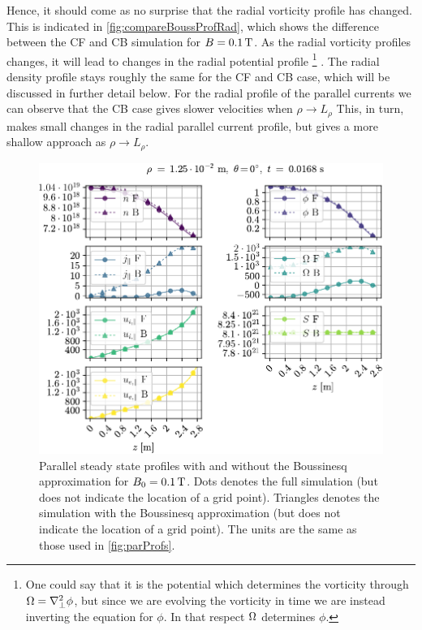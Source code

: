 Hence, it should come as no surprise that the radial vorticity profile has changed.
This is indicated in \cref{fig:compareBoussProfRad}, which shows the difference between the CF and CB simulation for $B=0.1\, \text{T}$.
As the radial vorticity profiles changes, it will lead to changes in the radial potential profile%
%
\footnote{One could say that it is the potential which determines the vorticity through $\Omega = \nabla_\perp^2 \phi$, but since we are evolving the vorticity in time we are instead inverting the equation for $\phi$.
In that respect $\Omega$ determines $\phi$.}%
%
.
The radial density profile stays roughly the same for the CF and CB case, which will be discussed in further detail below.
For the radial profile of the parallel currents we can observe that the CB case gives slower velocities when $\rho \to L_\rho$
This, in turn, makes small changes in the radial parallel current profile, but gives a more shallow approach as $\rho\to L_\rho$.
%
\begin{figure}[h]
    \centering
    \includegraphics{fig/results/compareBouss/1DProfPar001B}
    \caption{Parallel steady state profiles with and without the Boussinesq approximation for $B_0=0.1\, \text{T}$.
        Dots denotes the full simulation (but does not indicate the location of a grid point).
        Triangles denotes the simulation with the Boussinesq approximation (but does not indicate the location of a grid point).
        The units are the same as those used in \cref{fig:parProfs}.
    }
    \label{fig:compareBoussProfPar}
\end{figure}
%

